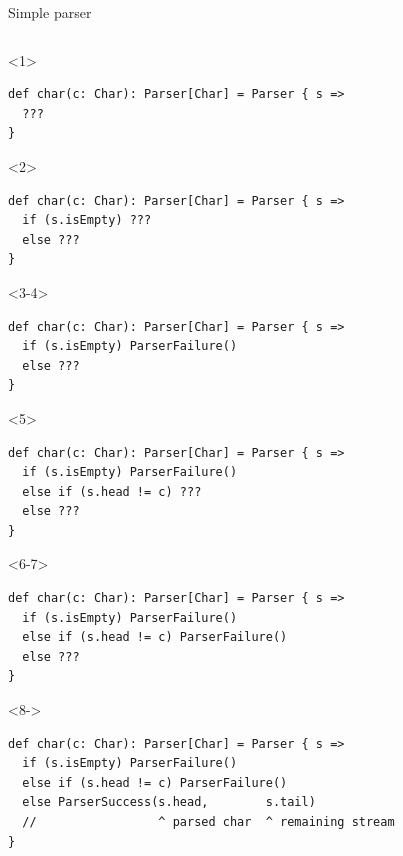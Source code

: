 \documentclass[presentation,aspectratio=169,smaller]{beamer}
\begin{document}
\begin{frame}[label={sec:orge81b1a8},fragile,t]{Simple parser}
 \vspace*{20px}

\begin{columns}
\begin{column}[t]{0.5\columnwidth}
\begin{onlyenv}<1>
\begin{verbatim}
def char(c: Char): Parser[Char] = Parser { s =>
  ???
}
\end{verbatim}
\end{onlyenv}

\begin{onlyenv}<2>
\begin{verbatim}
def char(c: Char): Parser[Char] = Parser { s =>
  if (s.isEmpty) ???
  else ???
}
\end{verbatim}
\end{onlyenv}

\begin{onlyenv}<3-4>
\begin{verbatim}
def char(c: Char): Parser[Char] = Parser { s =>
  if (s.isEmpty) ParserFailure()
  else ???
}
\end{verbatim}
\end{onlyenv}

\begin{onlyenv}<5>
\begin{verbatim}
def char(c: Char): Parser[Char] = Parser { s =>
  if (s.isEmpty) ParserFailure()
  else if (s.head != c) ???
  else ???
}
\end{verbatim}
\end{onlyenv}

\begin{onlyenv}<6-7>
\begin{verbatim}
def char(c: Char): Parser[Char] = Parser { s =>
  if (s.isEmpty) ParserFailure()
  else if (s.head != c) ParserFailure()
  else ???
}
\end{verbatim}
\end{onlyenv}

\begin{onlyenv}<8->
\begin{verbatim}
def char(c: Char): Parser[Char] = Parser { s =>
  if (s.isEmpty) ParserFailure()
  else if (s.head != c) ParserFailure()
  else ParserSuccess(s.head,        s.tail)
  //                 ^ parsed char  ^ remaining stream
}
\end{verbatim}
\end{onlyenv}
\end{column}


\end{columns}
\end{frame}
\end{document}
